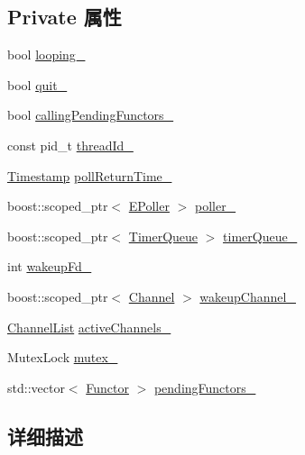 \subsection*{Private 属性}
\begin{DoxyCompactItemize}
\item 
bool \hyperlink{classmuduo_1_1EventLoop_a56192e02721abc39fdcc5fec930beb42}{looping\+\_\+}
\item 
bool \hyperlink{classmuduo_1_1EventLoop_ad03d5e60173eec4928f28be29b5cbacf}{quit\+\_\+}
\item 
bool \hyperlink{classmuduo_1_1EventLoop_a5a34dfe17bae44f99e2c05ce2a952c90}{calling\+Pending\+Functors\+\_\+}
\item 
const pid\+\_\+t \hyperlink{classmuduo_1_1EventLoop_a34adb5b3e132d9207ceed3440b4f2ab1}{thread\+Id\+\_\+}
\item 
\hyperlink{classmuduo_1_1Timestamp}{Timestamp} \hyperlink{classmuduo_1_1EventLoop_a9331500c7091e0eec7cb1e608897b0ed}{poll\+Return\+Time\+\_\+}
\item 
boost\+::scoped\+\_\+ptr$<$ \hyperlink{classmuduo_1_1EPoller}{E\+Poller} $>$ \hyperlink{classmuduo_1_1EventLoop_ac086876e4c7ab85ef83d35afa0340693}{poller\+\_\+}
\item 
boost\+::scoped\+\_\+ptr$<$ \hyperlink{classmuduo_1_1TimerQueue}{Timer\+Queue} $>$ \hyperlink{classmuduo_1_1EventLoop_a5e84bc1cb5c3f44f9a4d6c0e6ea1ee29}{timer\+Queue\+\_\+}
\item 
int \hyperlink{classmuduo_1_1EventLoop_a14cd183489944d3bf82c0c1907eeaa30}{wakeup\+Fd\+\_\+}
\item 
boost\+::scoped\+\_\+ptr$<$ \hyperlink{classmuduo_1_1Channel}{Channel} $>$ \hyperlink{classmuduo_1_1EventLoop_a65578f34006755d9c3ddd66969874bd4}{wakeup\+Channel\+\_\+}
\item 
\hyperlink{classmuduo_1_1EventLoop_a0b74248ffee6df294563618187b52404}{Channel\+List} \hyperlink{classmuduo_1_1EventLoop_a9196549e63e60c1a0749ca09d7df6155}{active\+Channels\+\_\+}
\item 
Mutex\+Lock \hyperlink{classmuduo_1_1EventLoop_a6e1bf1809a42f40f1a21178dc6620a6f}{mutex\+\_\+}
\item 
std\+::vector$<$ \hyperlink{classmuduo_1_1EventLoop_aa47556388c5bf0b2534c9816841d8e7a}{Functor} $>$ \hyperlink{classmuduo_1_1EventLoop_ab8934a9424f158aa4f0346132f24a2d6}{pending\+Functors\+\_\+}
\end{DoxyCompactItemize}


\subsection{详细描述}


